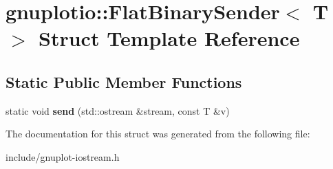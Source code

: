 \hypertarget{structgnuplotio_1_1FlatBinarySender}{}\section{gnuplotio\+:\+:Flat\+Binary\+Sender$<$ T $>$ Struct Template Reference}
\label{structgnuplotio_1_1FlatBinarySender}
\subsection*{Static Public Member Functions}
\begin{DoxyCompactItemize}
\item 
\mbox{\label{structgnuplotio_1_1FlatBinarySender_a24d085492f2539c14033cd5c6ba75ba5}} 
static void {\bfseries send} (std\+::ostream \&stream, const T \&v)
\end{DoxyCompactItemize}


The documentation for this struct was generated from the following file\+:\begin{DoxyCompactItemize}
\item 
include/gnuplot-\/iostream.\+h\end{DoxyCompactItemize}
